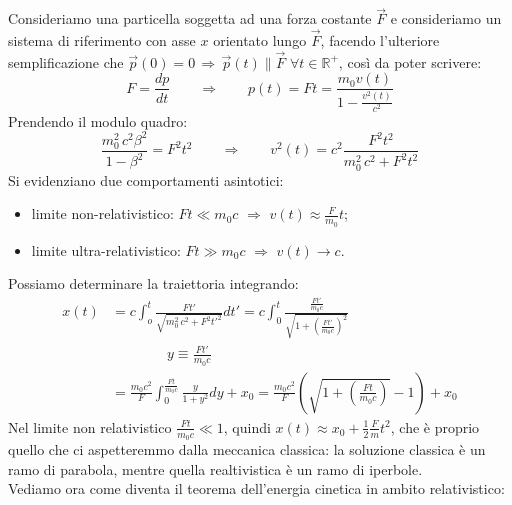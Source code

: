 Consideriamo una particella soggetta ad una forza costante $ \vec{F} $ e consideriamo un sistema di riferimento con asse $ x $ orientato lungo $ \vec{F} $, facendo l'ulteriore semplificazione che $ \vec{p}(0) = 0 \,\Rightarrow\, \vec{p}(t) \parallel \vec{F} \,\,\forall t\in\mathbb{R}^+$, così da poter scrivere:
\begin{equation}
	F = \displaystyle\frac{dp}{dt} \qquad \Longrightarrow \qquad p(t) = F t = \displaystyle\frac{m_0 v(t)}{1 - \frac{v^2(t)}{c^2}}
	\label{eq:18}
\end{equation}
Prendendo il modulo quadro:
\begin{equation}
	\displaystyle\frac{m_0^2 \, c^2 \beta^2}{1 - \beta^2} = F^2 t^2 \qquad \Longrightarrow \qquad v^2(t) = c^2 \displaystyle\frac{F^2 t^2}{m_0^2 \, c^2 + F^2 t^2}
	\label{eq:19}
\end{equation}
Si evidenziano due comportamenti asintotici:
\begin{itemize}
	\item limite non-relativistico: $ Ft \ll m_0 c \,\,\Rightarrow\,\, v(t) \approx \frac{F}{m_0}t$;
	\item limite ultra-relativistico: $ Ft \gg m_0 c \,\,\Rightarrow\,\, v(t) \rightarrow c $.
\end{itemize}
Possiamo determinare la traiettoria integrando:
\begin{equation}
	\begin{split}
		x(t) &= c \int_o^t \displaystyle\frac{Ft'}{\sqrt{{m_0^2 \, c^2 + F^2 t'^2}}} dt' = c \int_0^t \displaystyle\frac{\frac{Ft'}{m_0 c}}{\sqrt{1 + (\frac{F t'}{m_0 c})^2}} \\ 
		     & \qquad\qquad y \equiv \frac{F t'}{m_0 c} \\ 
		     &= \frac{m_0 c^2}{F} \int_0^{\frac{Ft}{m_0 c}} \displaystyle\frac{y}{1 + y^2} dy + x_0 = \displaystyle\frac{m_0 c^2}{F} \left(\sqrt{1 + \left(\frac{F t}{m_0 c}\right)} - 1\right) + x_0
	\end{split}
	\label{eq:20}
\end{equation}
Nel limite non relativistico $ \frac{Ft}{m_0c} \ll 1 $, quindi $ x(t) \approx x_0 + \frac{1}{2}\frac{F}{m}t^2 $, che è proprio quello che ci aspetteremmo dalla meccanica classica: la soluzione classica è un ramo di parabola, mentre quella realtivistica è un ramo di iperbole. \\ 
%
Vediamo ora come diventa il teorema dell'energia cinetica in ambito relativistico:
